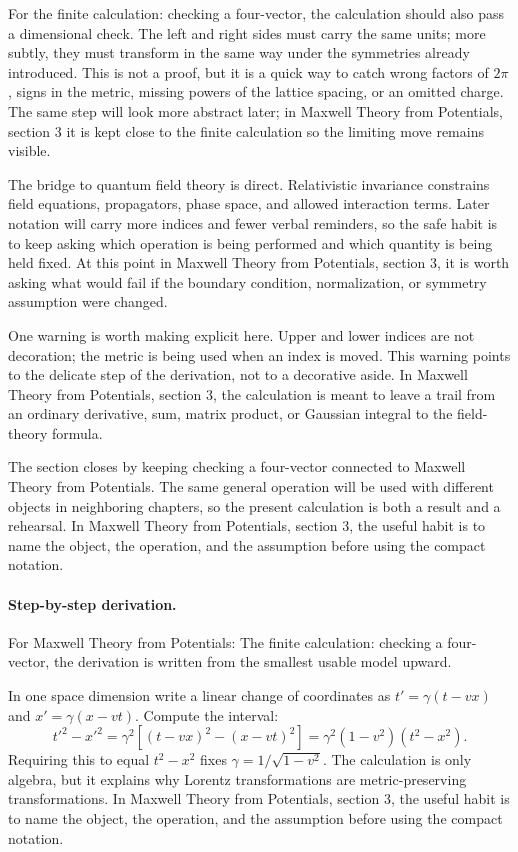 For the finite calculation: checking a four-vector, the calculation should also pass a dimensional check.  The left and right sides must carry the same units; more subtly, they must transform in the same way under the symmetries already introduced.  This is not a proof, but it is a quick way to catch wrong factors of \(2\pi\), signs in the metric, missing powers of the lattice spacing, or an omitted charge.  The same step will look more abstract later; in Maxwell Theory from Potentials, section 3 it is kept close to the finite calculation so the limiting move remains visible.

The bridge to quantum field theory is direct.  Relativistic invariance constrains field equations, propagators, phase space, and allowed interaction terms.  Later notation will carry more indices and fewer verbal reminders, so the safe habit is to keep asking which operation is being performed and which quantity is being held fixed.  At this point in Maxwell Theory from Potentials, section 3, it is worth asking what would fail if the boundary condition, normalization, or symmetry assumption were changed.

One warning is worth making explicit here.  Upper and lower indices are not decoration; the metric is being used when an index is moved.  This warning points to the delicate step of the derivation, not to a decorative aside.  In Maxwell Theory from Potentials, section 3, the calculation is meant to leave a trail from an ordinary derivative, sum, matrix product, or Gaussian integral to the field-theory formula.

The section closes by keeping checking a four-vector connected to Maxwell Theory from Potentials.  The same general operation will be used with different objects in neighboring chapters, so the present calculation is both a result and a rehearsal.  In Maxwell Theory from Potentials, section 3, the useful habit is to name the object, the operation, and the assumption before using the compact notation.



\paragraph{Step-by-step derivation.}

For Maxwell Theory from Potentials: The finite calculation: checking a four-vector, the derivation is written from the smallest usable model upward.

In one space dimension write a linear change of coordinates as \(t'=\gamma(t-vx)\) and \(x'=\gamma(x-vt)\).  Compute the interval:
\[
  t'^2-x'^2
  =
  \gamma^2[(t-vx)^2-(x-vt)^2]
  =
  \gamma^2(1-v^2)(t^2-x^2).
\]
Requiring this to equal \(t^2-x^2\) fixes \(\gamma=1/\sqrt{1-v^2}\).  The calculation is only algebra, but it explains why Lorentz transformations are metric-preserving transformations.  In Maxwell Theory from Potentials, section 3, the useful habit is to name the object, the operation, and the assumption before using the compact notation.

